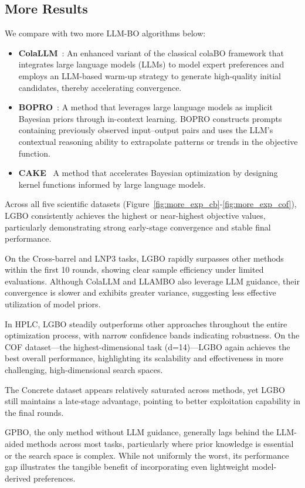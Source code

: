 \documentclass{article} %
\begin{document}
\subsection{More Results}
We compare with two more LLM-BO algorithms below:
\begin{itemize}
    \item \textbf{ColaLLM}~\citep{Hvarfner2024ColaBO}: An enhanced variant of the classical colaBO framework that integrates large language models (LLMs) to model expert preferences and employs an LLM-based warm-up strategy to generate high-quality initial candidates, thereby accelerating convergence.

    \item \textbf{BOPRO}~\citep{BOPRO}: A method that leverages large language models as implicit Bayesian priors through in-context learning. BOPRO constructs prompts containing previously observed input--output pairs and uses the LLM’s contextual reasoning ability to extrapolate patterns or trends in the objective function. 
    \item \textbf{CAKE}~\citep{CAKE} A method that accelerates Bayesian optimization by designing kernel functions informed by large language models.
\end{itemize}
Across all five scientific datasets (Figure~\ref{fig:more_exp_cb}-\ref{fig:more_exp_cof}), LGBO consistently achieves the highest or near-highest objective values, particularly demonstrating strong early-stage convergence and stable final performance.

On the Cross-barrel and LNP3 tasks, LGBO rapidly surpasses other methods within the first 10 rounds, showing clear sample efficiency under limited evaluations. Although ColaLLM and LLAMBO also leverage LLM guidance, their convergence is slower and exhibits greater variance, suggesting less effective utilization of model priors.

In HPLC, LGBO steadily outperforms other approaches throughout the entire optimization process, with narrow confidence bands indicating robustness. On the COF dataset—the highest-dimensional task (d=14)—LGBO again achieves the best overall performance, highlighting its scalability and effectiveness in more challenging, high-dimensional search spaces.

The Concrete dataset appears relatively saturated across methods, yet LGBO still maintains a late-stage advantage, pointing to better exploitation capability in the final rounds.

GPBO, the only method without LLM guidance, generally lags behind the LLM-aided methods across most tasks, particularly where prior knowledge is essential or the search space is complex. While not uniformly the worst, its performance gap illustrates the tangible benefit of incorporating even lightweight model-derived preferences.
\end{document}
